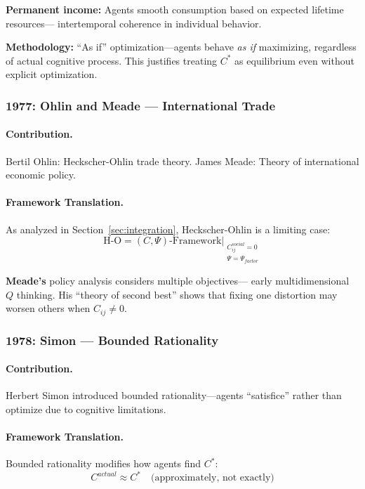 \textbf{Permanent income:} Agents smooth consumption based on expected lifetime resources---
intertemporal coherence in individual behavior.

\textbf{Methodology:} ``As if'' optimization---agents behave \emph{as if} maximizing,
regardless of actual cognitive process. This justifies treating $C^*$ as
equilibrium even without explicit optimization.

\subsubsection{1977: Ohlin and Meade --- International Trade}

\paragraph{Contribution.}
Bertil Ohlin: Heckscher-Ohlin trade theory.
James Meade: Theory of international economic policy.

\paragraph{Framework Translation.}
As analyzed in Section~\ref{sec:integration}, Heckscher-Ohlin is a limiting case:
\begin{equation}
  \text{H-O} = (C, \Psi)\text{-Framework} \Big|_{\substack{C_{ij}^{social} = 0 \\ \Psi = \Psi_{factor}}}
\end{equation}

\textbf{Meade's} policy analysis considers multiple objectives---
early multidimensional $Q$ thinking. His ``theory of second best''
shows that fixing one distortion may worsen others when $C_{ij} \neq 0$.

\subsubsection{1978: Simon --- Bounded Rationality}

\paragraph{Contribution.}
Herbert Simon \citep{simon1955} introduced bounded rationality---agents ``satisfice''
rather than optimize due to cognitive limitations.

\paragraph{Framework Translation.}
Bounded rationality modifies how agents find $C^*$:
\begin{equation}
  C^{actual} \approx C^* \quad \text{(approximately, not exactly)}
\end{equation}

